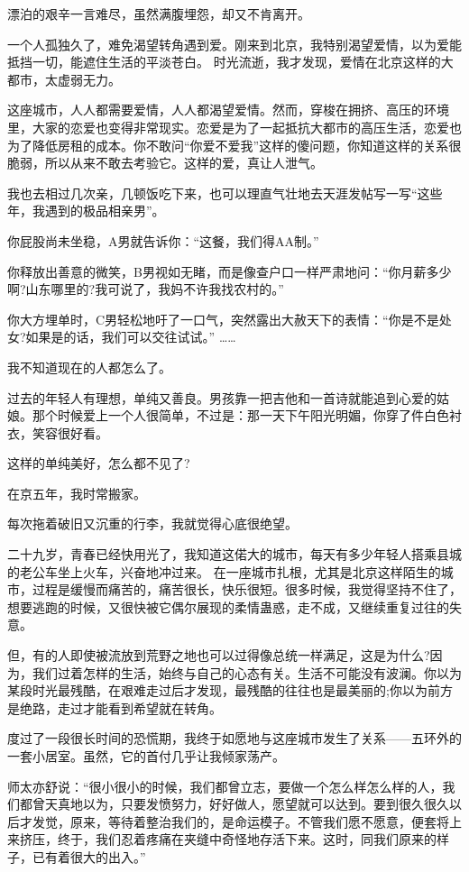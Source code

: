 \documentclass[UTF8,a4paper,8pt]{ctexbook}
\begin{document}
	 漂泊的艰辛一言难尽，虽然满腹埋怨，却又不肯离开。
	 
	 一个人孤独久了，难免渴望转角遇到爱。刚来到北京，我特别渴望爱情，以为爱能抵挡一切，能遮住生活的平淡苍白。
	 时光流逝，我才发现，爱情在北京这样的大都市，太虚弱无力。
	 
	 这座城市，人人都需要爱情，人人都渴望爱情。然而，穿梭在拥挤、高压的环境里，大家的恋爱也变得非常现实。恋爱是为了一起抵抗大都市的高压生活，恋爱也为了降低房租的成本。你不敢问“你爱不爱我”这样的傻问题，你知道这样的关系很脆弱，所以从来不敢去考验它。这样的爱，真让人泄气。
	 
	 我也去相过几次亲，几顿饭吃下来，也可以理直气壮地去天涯发帖写一写“这些年，我遇到的极品相亲男”。
	 
	 你屁股尚未坐稳，A男就告诉你：“这餐，我们得AA制。”
	 
	 你释放出善意的微笑，B男视如无睹，而是像查户口一样严肃地问：“你月薪多少啊?山东哪里的?我可说了，我妈不许我找农村的。”
	 
	 你大方埋单时，C男轻松地吁了一口气，突然露出大赦天下的表情：“你是不是处女?如果是的话，我们可以交往试试。”
	 ……
	 
	 我不知道现在的人都怎么了。
	 
	 过去的年轻人有理想，单纯又善良。男孩靠一把吉他和一首诗就能追到心爱的姑娘。那个时候爱上一个人很简单，不过是：那一天下午阳光明媚，你穿了件白色衬衣，笑容很好看。
	 
	 这样的单纯美好，怎么都不见了?
	 
	 在京五年，我时常搬家。
	 
	 每次拖着破旧又沉重的行李，我就觉得心底很绝望。
	 
	 二十九岁，青春已经快用光了，我知道这偌大的城市，每天有多少年轻人搭乘县城的老公车坐上火车，兴奋地冲过来。
	 在一座城市扎根，尤其是北京这样陌生的城市，过程是缓慢而痛苦的，痛苦很长，快乐很短。很多时候，我觉得坚持不住了，想要逃跑的时候，又很快被它偶尔展现的柔情蛊惑，走不成，又继续重复过往的失意。
	 
	 但，有的人即使被流放到荒野之地也可以过得像总统一样满足，这是为什么?因为，我们过着怎样的生活，始终与自己的心态有关。生活不可能没有波澜。你以为某段时光最残酷，在艰难走过后才发现，最残酷的往往也是最美丽的;你以为前方是绝路，走过才能看到希望就在转角。
	 
	 度过了一段很长时间的恐慌期，我终于如愿地与这座城市发生了关系——五环外的一套小居室。虽然，它的首付几乎让我倾家荡产。
	 
	 师太亦舒说：“很小很小的时候，我们都曾立志，要做一个怎么样怎么样的人，我们都曾天真地以为，只要发愤努力，好好做人，愿望就可以达到。要到很久很久以后才发觉，原来，等待着整治我们的，是命运模子。不管我们愿不愿意，便套将上来挤压，终于，我们忍着疼痛在夹缝中奇怪地存活下来。这时，同我们原来的样子，已有着很大的出入。”
	 
\end{document}
